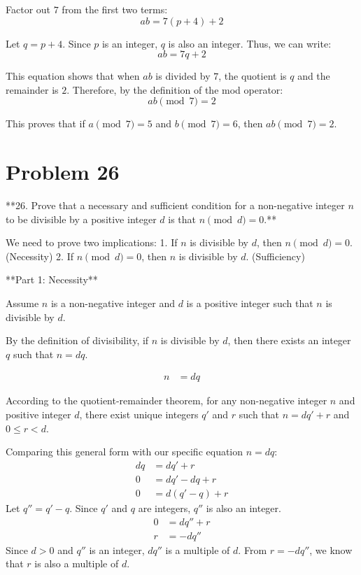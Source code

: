 \documentclass{article}
\begin{document}
Factor out $7$ from the first two terms:
$$ab = 7(p + 4) + 2$$

Let $q = p + 4$. Since $p$ is an integer, $q$ is also an integer.
Thus, we can write:
$$ab = 7q + 2$$

This equation shows that when $ab$ is divided by $7$, the quotient is $q$ and the remainder is $2$.
Therefore, by the definition of the mod operator:
$$ab \pmod{7} = 2$$

This proves that if $a \pmod{7} = 5$ and $b \pmod{7} = 6$, then $ab \pmod{7} = 2$.

\newpage

\section*{Problem 26}
**26. Prove that a necessary and sufficient condition for a non-negative integer $n$ to be divisible by a positive integer $d$ is that $n \pmod{d} = 0$.**

We need to prove two implications:
1. If $n$ is divisible by $d$, then $n \pmod{d} = 0$. (Necessity)
2. If $n \pmod{d} = 0$, then $n$ is divisible by $d$. (Sufficiency)

**Part 1: Necessity**

Assume $n$ is a non-negative integer and $d$ is a positive integer such that $n$ is divisible by $d$.

By the definition of divisibility, if $n$ is divisible by $d$, then there exists an integer $q$ such that $n = dq$.

\begin{align*} n &= dq \end{align*}

According to the quotient-remainder theorem, for any non-negative integer $n$ and positive integer $d$, there exist unique integers $q'$ and $r$ such that $n = dq' + r$ and $0 \le r < d$.

Comparing this general form with our specific equation $n = dq$:
\begin{align*} dq &= dq' + r \\ 0 &= dq' - dq + r \\ 0 &= d(q' - q) + r \end{align*}
Let $q'' = q' - q$. Since $q'$ and $q$ are integers, $q''$ is also an integer.
\begin{align*} 0 &= dq'' + r \\ r &= -dq'' \end{align*}
Since $d > 0$ and $q''$ is an integer, $dq''$ is a multiple of $d$.
From $r = -dq''$, we know that $r$ is also a multiple of $d$.
\end{document}
